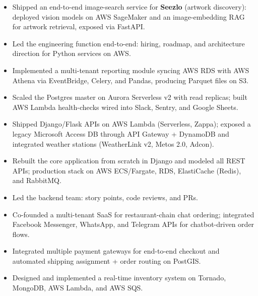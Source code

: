 \begin{itemize}
  \item Shipped an end-to-end image-search service for \textbf{Seezlo} (artwork discovery): deployed vision models on AWS SageMaker and an image-embedding RAG for artwork retrieval, exposed via FastAPI.
  \item Led the engineering function end-to-end: hiring, roadmap, and architecture direction for Python services on AWS.
\end{itemize}

\begin{itemize}
  \item Implemented a multi-tenant reporting module syncing AWS RDS with AWS Athena via EventBridge, Celery, and Pandas, producing Parquet files on S3.
  \item Scaled the Postgres master on Aurora Serverless v2 with read replicas; built AWS Lambda health-checks wired into Slack, Sentry, and Google Sheets.
  \item Shipped Django/Flask APIs on AWS Lambda (Serverless, Zappa); exposed a legacy Microsoft Access DB through API Gateway + DynamoDB and integrated weather stations (WeatherLink v2, Metos 2.0, Adcon).
\end{itemize}

\begin{itemize}
  \item Rebuilt the core application from scratch in Django and modeled all REST APIs; production stack on AWS ECS/Fargate, RDS, ElastiCache (Redis), and RabbitMQ.
  \item Led the backend team: story points, code reviews, and PRs.
\end{itemize}

\begin{itemize}
  \item Co-founded a multi-tenant SaaS for restaurant-chain chat ordering; integrated Facebook Messenger, WhatsApp, and Telegram APIs for chatbot-driven order flows.
  \item Integrated multiple payment gateways for end-to-end checkout and automated shipping assignment + order routing on PostGIS.
\end{itemize}

\begin{itemize}
  \item Designed and implemented a real-time inventory system on Tornado,
        MongoDB, AWS Lambda, and AWS SQS.
\end{itemize}

